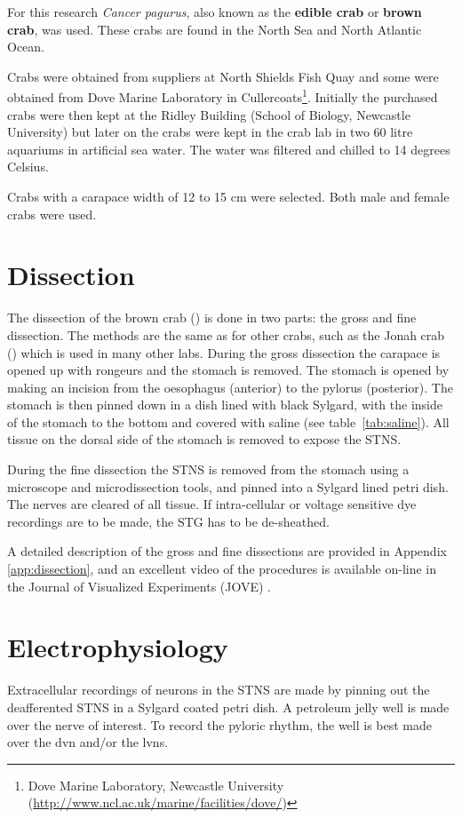 For this research \textit{Cancer pagurus}, also known as the \textbf{edible crab} or \textbf{brown crab}, was used. These crabs are found in the North Sea and North Atlantic Ocean.

Crabs were obtained from suppliers at North Shields Fish Quay and some were obtained from Dove Marine Laboratory in Cullercoats\footnote{Dove Marine Laboratory, Newcastle University (\url{http://www.ncl.ac.uk/marine/facilities/dove/})}. Initially the purchased crabs were then kept at the Ridley Building (School of Biology, Newcastle University) but later on the crabs were kept in the crab lab in two 60 litre aquariums in artificial sea water. The water was filtered and chilled to 14 degrees Celsius.

Crabs with a carapace width of 12 to 15 cm were selected. Both male and female crabs were used.

\section{Dissection}
\label{sec:dissection}

The dissection of the brown crab () is done in two parts: the gross and fine dissection. The methods are the same as for other crabs, such as the Jonah crab () which is used in many other labs. During the gross dissection the carapace is opened up with rongeurs and the stomach is removed. The stomach is opened by making an incision from the oesophagus (anterior) to the pylorus (posterior). The stomach is then pinned down in a dish lined with black Sylgard, with the inside of the stomach to the bottom and covered with  saline (see table~\ref{tab:saline}). All tissue on the dorsal side of the stomach is removed to expose the \ac{STNS}.

During the fine dissection the \ac{STNS} is removed from the stomach using a microscope and microdissection tools, and pinned into a Sylgard lined petri dish. The nerves are cleared of all tissue. If intra-cellular or voltage sensitive dye recordings are to be made, the \ac{STG} has to be de-sheathed.

A detailed description of the gross and fine dissections are provided in Appendix \ref{app:dissection}, and an excellent video of the procedures is available on-line in the Journal of Visualized Experiments (JOVE) \cite{Gutierrez2009}.

\section{Electrophysiology}
\label{sec:electrophysiology}
Extracellular recordings of neurons in the \ac{STNS} are made by pinning out the deafferented \ac{STNS} in a Sylgard coated petri dish. A petroleum jelly well is made over the nerve of interest. To record the pyloric rhythm, the well is best made over the \ac{dvn} and/or the \acp{lvn}.


